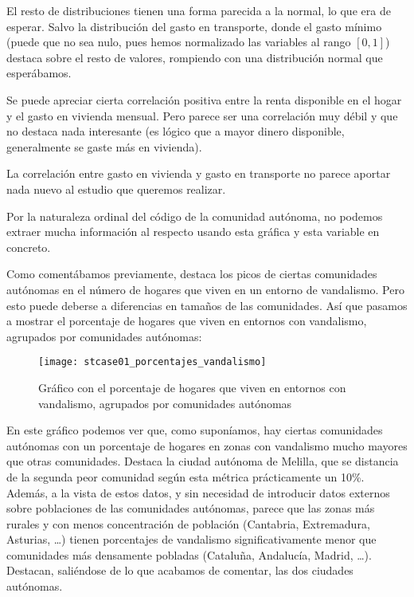 \documentclass[11pt]{article}
\begin{document}
El resto de distribuciones tienen una forma parecida a la normal, lo que era de esperar. Salvo la distribución del gasto en transporte, donde el gasto mínimo (puede que no sea nulo, pues hemos normalizado las variables al rango $[0, 1]$) destaca sobre el resto de valores, rompiendo con una distribución normal que esperábamos.

Se puede apreciar cierta correlación positiva entre la renta disponible en el hogar y el gasto en vivienda mensual. Pero parece ser una correlación muy débil y que no destaca nada interesante (es lógico que a mayor dinero disponible, generalmente se gaste más en vivienda).

La correlación entre gasto en vivienda y gasto en transporte no parece aportar nada nuevo al estudio que queremos realizar.

Por la naturaleza ordinal del código de la comunidad autónoma, no podemos extraer mucha información al respecto usando esta gráfica y esta variable en concreto.

Como comentábamos previamente, destaca los picos de ciertas comunidades autónomas en el número de hogares que viven en un entorno de vandalismo. Pero esto puede deberse a diferencias en tamaños de las comunidades. Así que pasamos a mostrar el porcentaje de hogares que viven en entornos con vandalismo, agrupados por comunidades autónomas:

\begin{figure}[H]
    \centering

    \texttt{[image: stcase01\_porcentajes\_vandalismo]}
    \caption{Gráfico con el porcentaje de hogares que viven en entornos con vandalismo, agrupados por comunidades autónomas}
    \label{grafica_vandalismo:figure}
\end{figure}

En este gráfico podemos ver que, como suponíamos, hay ciertas comunidades autónomas con un porcentaje de hogares en zonas con vandalismo mucho mayores que otras comunidades. Destaca la ciudad autónoma de Melilla, que se distancia de la segunda peor comunidad según esta métrica prácticamente un 10\%. Además, a la vista de estos datos, y sin necesidad de introducir datos externos sobre poblaciones de las comunidades autónomas, parece que las zonas más rurales y con menos concentración de población (Cantabria, Extremadura, Asturias, \ldots) tienen porcentajes de vandalismo significativamente menor que comunidades más densamente pobladas (Cataluña, Andalucía, Madrid, \ldots). Destacan, saliéndose de lo que acabamos de comentar, las dos ciudades autónomas.
\end{document}
